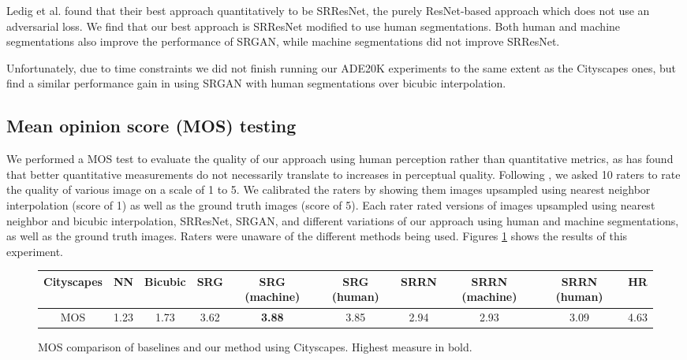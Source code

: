 \documentclass[10pt,twocolumn,letterpaper]{article}
\begin{document}
Ledig et al. \cite{SRGAN} found that their best approach quantitatively to be
SRResNet, the purely ResNet-based approach which does not use an adversarial
loss. We find that our best approach is SRResNet modified to use human
segmentations. Both human and machine segmentations also improve the
performance of SRGAN, while machine segmentations did not improve SRResNet.

Unfortunately, due to time constraints we did not finish running our ADE20K
experiments to the same extent as the Cityscapes ones, but find a similar
performance gain in using SRGAN with human segmentations over bicubic
interpolation.

\subsection{Mean opinion score (MOS) testing}
We performed a MOS test to evaluate the quality of our approach using human
perception rather than quantitative metrics, as \cite{SRGAN} has found that
better quantitative measurements do not necessarily translate to increases in
perceptual quality. Following \cite{SRGAN}, we asked 10 raters to rate the
quality of various image on a scale of 1 to 5. We calibrated the raters by
showing them images upsampled using nearest neighbor interpolation (score of 1)
as well as the ground truth images (score of 5). Each rater rated versions of
images upsampled using nearest neighbor and bicubic interpolation, SRResNet,
SRGAN, and different variations of our approach using human and machine
segmentations, as well as the ground truth images. Raters were unaware of the
different methods being used. Figures \ref{fig:mos} shows the results of this
experiment.

\begin{figure}[ht!]
    \begin{center}
        \small
        \begin{tabular}{c ccccccccc}
            \textbf{Cityscapes} & NN & Bicubic & SRG & SRG (machine) & SRG
            (human) & SRRN & SRRN (machine) & SRRN (human) & HR \\
            \hline
            MOS & 1.23 & 1.73 & 3.62 & \textbf{3.88} & 3.85 & 2.94 & 2.93 & 3.09 & 4.63
        \end{tabular}
    \end{center}
    \caption{MOS comparison of baselines and our method using Cityscapes. Highest
    measure in bold.}
    \label{fig:mos}
\end{figure}
\end{document}
